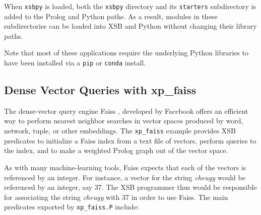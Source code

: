 When {\tt xsbpy} is loaded, both the {\tt xsbpy} directory and its
{\tt starters} subdirectory is added to the Prolog and Python paths.
As a result, modules in these subdirectories can be loaded into XSB
and Python without changing their library paths.

Note that most of these applications require the underlying Python
libraries to have been installed via a {\tt pip} or {\tt conda}
install.

\subsection{Dense Vector Queries with xp\_faiss}
The dense-vector query engine Faiss \cite{JDH17}, developed by
Facebook offers an efficient way to perform nearest neighbor searches
in vector spaces produced by word, network, tuple, or other
embeddings.  The {\tt xp\_faiss} example provides XSB predicates to
initialize a Faiss index from a text file of vectors, perform queries
to the index, and to make a weighted Prolog graph out of the vector
space.  

As with many machine-learning tools, Faiss expects that each of the
vectors is referenced by an integer.  For instance, a vector for the
string {\em cheugy} would be referenced by an integer, say 37.  The
XSB programmer thus would be responsible for associating the string
{\em cheugy} with 37 in order to use Faiss.  The main predicates
exported by {\tt xp\_faiss.P} include:

